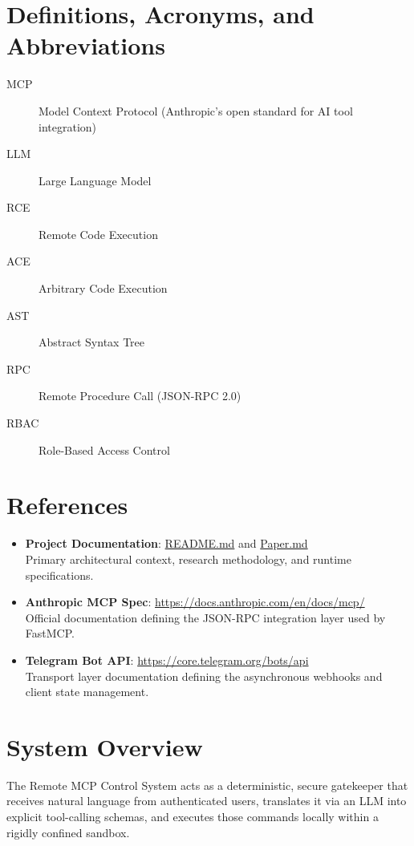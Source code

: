 \documentclass{scrreprt}
\begin{document}
\section{Definitions, Acronyms, and Abbreviations}
\label{sec:definitions}
\begin{description}
    \item[MCP] Model Context Protocol (Anthropic's open standard for AI tool integration)
    \item[LLM] Large Language Model
    \item[RCE] Remote Code Execution
    \item[ACE] Arbitrary Code Execution
    \item[AST] Abstract Syntax Tree
    \item[RPC] Remote Procedure Call (JSON-RPC 2.0)
    \item[RBAC] Role-Based Access Control
\end{description}

\section{References}
\label{sec:references}
\begin{itemize}
    \item \textbf{Project Documentation}: \url{README.md} and \url{Paper.md} \\
    \footnotesize{Primary architectural context, research methodology, and runtime specifications.}
    
    \item \textbf{Anthropic MCP Spec}: \url{https://docs.anthropic.com/en/docs/mcp/} \\
    \footnotesize{Official documentation defining the JSON-RPC integration layer used by FastMCP.}
    
    \item \textbf{Telegram Bot API}: \url{https://core.telegram.org/bots/api} \\
    \footnotesize{Transport layer documentation defining the asynchronous webhooks and client state management.}
\end{itemize}

\section{System Overview}
\label{sec:system-overview}
The Remote MCP Control System acts as a deterministic, secure gatekeeper that receives natural language from authenticated users, translates it via an LLM into explicit tool-calling schemas, and executes those commands locally within a rigidly confined sandbox.
\end{document}
